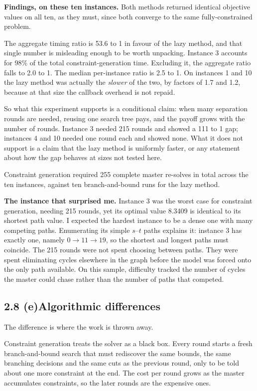 \documentclass[11pt]{article}
\begin{document}
\textbf{Findings, on these ten instances.}\quad
Both methods returned identical objective values on all ten, as they
must, since both converge to the same fully-constrained problem.

The aggregate timing ratio is 53.6 to 1 in favour of the lazy method,
and that single number is misleading enough to be worth unpacking.
Instance 3 accounts for 98\% of the total constraint-generation time.
Excluding it, the aggregate ratio falls to 2.0 to 1. The median
per-instance ratio is 2.5 to 1. On instances 1 and 10 the lazy method
was actually the \emph{slower} of the two, by factors of 1.7 and 1.2,
because at that size the callback overhead is not repaid.

So what this experiment supports is a conditional claim: when many
separation rounds are needed, reusing one search tree pays, and the
payoff grows with the number of rounds. Instance 3 needed 215 rounds and
showed a 111 to 1 gap; instances 4 and 10 needed one round each and
showed none. What it does not support is a claim that the lazy method is
uniformly faster, or any statement about how the gap behaves at sizes
not tested here.

Constraint generation required 255 complete master re-solves in total
across the ten instances, against ten branch-and-bound runs for the lazy
method.

\textbf{The instance that surprised me.}\quad
Instance 3 was the worst case for constraint generation, needing 215
rounds, yet its optimal value 8.3409 is identical to its shortest path
value. I expected the hardest instance to be a dense one with many
competing paths. Enumerating its simple $s$--$t$ paths explains it:
instance 3 has exactly one, namely $0 \rightarrow 11 \rightarrow 19$, so
the shortest and longest paths must coincide. The 215 rounds were not
spent choosing between paths. They were spent eliminating cycles
elsewhere in the graph before the model was forced onto the only path
available. On this sample, difficulty tracked the number of cycles the
master could chase rather than the number of paths that competed.

\subsection*{2.8 (e)\quad Algorithmic differences}

The difference is where the work is thrown away.

Constraint generation treats the solver as a black box. Every round
starts a fresh branch-and-bound search that must rediscover the same
bounds, the same branching decisions and the same cuts as the previous
round, only to be told about one more constraint at the end. The cost
per round grows as the master accumulates constraints, so the later
rounds are the expensive ones.
\end{document}
